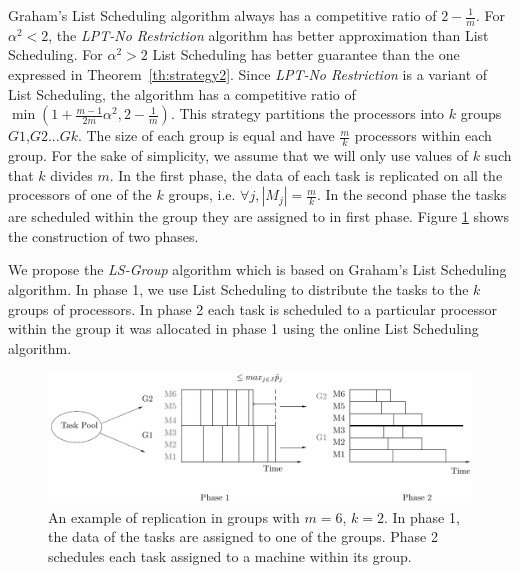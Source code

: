 \documentclass[12pt]{article}
\theoremstyle{mystyle}
\begin{document}
   Graham's List Scheduling algorithm always has a competitive ratio
   of $2-\frac{1}{m}$. For $\alpha^2 < 2$, the \textit{LPT-No
     Restriction} algorithm has better approximation than List
   Scheduling. For $\alpha^2 > 2$ List Scheduling has better guarantee
   than the one expressed in Theorem~\ref{th:strategy2}. Since
   \textit{LPT-No Restriction} is a variant of List Scheduling,
   the algorithm has a competitive ratio of $\min (1 +
   \frac{m-1}{2m}\alpha^{2}, 2-\frac{1}{m})$.
   This strategy partitions the processors into $k$ groups
    $G1$,$G2$...$Gk$. The size of each group is equal and have
    $\frac{m}{k}$ processors within each group. For the sake of
    simplicity, we assume that we will only use values of $k$ such that
    $k$ divides $m$. In the first phase, the data of each task is
    replicated on all the processors of one of the $k$ groups,
    i.e. $\forall j, |M_j|= \frac{m}{k}$. In the second phase the tasks
    are scheduled within the group they are assigned to in first phase.
    Figure \ref{fig:Model 3} shows the construction of two phases.
    
    We propose the \textit{LS-Group} algorithm which is based on Graham's
    List Scheduling algorithm. In phase 1, we use List Scheduling to
    distribute the tasks to the $k$ groups of processors. In phase 2 each
    task is scheduled to a particular processor within the group it was
    allocated in phase 1 using the online List Scheduling algorithm.
    
    \begin{figure}[htp] 
    \centering
    \includegraphics[width=\linewidth]{model3.pdf}
    \caption{An example of replication in groups with $m = 6$, $k = 2$. In
      phase 1, the data of the tasks are assigned to one of the
      groups. Phase 2 schedules each task assigned to a machine within its
      group.}
    \label{fig:Model 3}
    \end{figure}
    
\end{document}
